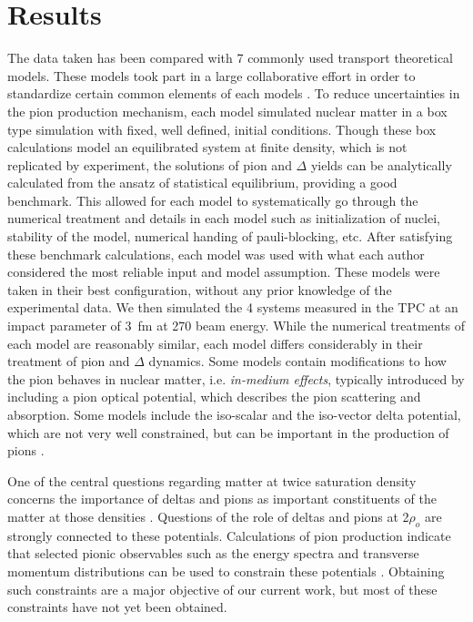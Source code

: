 \chapter{Results}
\label{chap:results}

 The data taken has been compared with 7 commonly used transport theoretical models. These models took part in a large collaborative effort in order to standardize certain common elements of each models \cite{theoryComp1,theoryComp2}. To reduce uncertainties in the pion production mechanism, each model simulated nuclear matter in a box type simulation with fixed, well defined, initial conditions. Though these box calculations model an equilibrated system at finite density, which is  not replicated by experiment, the solutions  of  pion and $\Delta$ yields can be analytically calculated from the ansatz of statistical equilibrium, providing a good benchmark. This allowed for each model to systematically go through the numerical treatment and details in each model such as initialization of nuclei, stability of the model, numerical handing of pauli-blocking, etc. After satisfying these benchmark calculations, each model was used with what each author considered the most reliable input and model assumption.  These models were taken in their best configuration, without any prior knowledge of the experimental data. We then simulated the 4 systems measured in the \spirit TPC at an impact parameter of \SI{3}{\femto\metre} at \SI{270}{\MeVA} beam energy. While the numerical treatments of each model are reasonably similar, each model differs considerably in their treatment of pion and $\Delta$ dynamics. Some models contain modifications to how the pion behaves in nuclear matter, i.e. \emph{in-medium effects}, typically introduced by including a pion optical potential, which describes the pion scattering and absorption. Some models include the iso-scalar and the iso-vector delta potential, which are not very well constrained, but can be important in the production of pions \cite{baoan_deltapotential,inmedPionKo,inmedPionFeng}. 


One of the central questions regarding matter at twice saturation density concerns the importance of deltas and pions as important constituents of the matter at those densities \cite{pionNS,deltaNS,awayforward}. Questions of the role of deltas and pions at 2$\rho_o$ are strongly connected to these potentials. Calculations of pion production indicate that selected pionic observables such as the energy spectra and transverse momentum distributions can be used to constrain these potentials \cite{cozmaPC}. Obtaining such constraints are a major objective of our current work, but most of these constraints have not yet been obtained.

